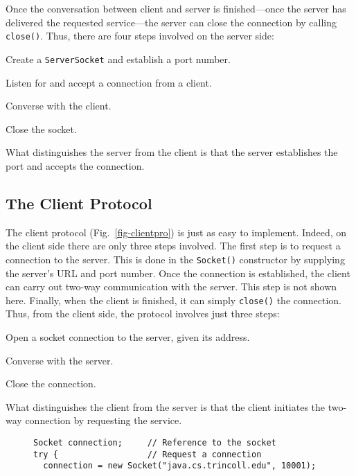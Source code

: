 {Once the conversation between client and server is finished---once
the server has delivered the requested service---the server can close
the connection by calling {\tt close()}. Thus, there are four steps
involved on the server side:

\begin{BL}
\item  Create a {\tt ServerSocket} and establish a port number.
\item  Listen for and accept a connection from a client.
\item  Converse with the client.
\item  Close the socket.
\end{BL}

\noindent What distinguishes the server from the client is that
the server establishes the port and accepts the connection.



\subsection{The Client Protocol}
\noindent The client protocol (Fig.~\ref{fig-clientpro}) is just as easy to
implement.   Indeed, on the client side there are only three steps involved.
The first step is to request a connection to the server.  This is done
in the {\tt Socket()} constructor by supplying the server's URL and
port number.  Once the connection is established, the client can carry
out two-way communication with the server.  This step is not shown
here.  Finally, when the client is finished, it can simply {\tt close()}
the connection.  Thus, from the client side, the protocol involves just
three steps:

\begin{BL}
\item  Open a socket connection to the server, given its address.
\item  Converse with the server.
\item  Close the connection.
\end{BL}

\noindent What distinguishes the client from the server is that the
client initiates the two-way connection by requesting the service.

\begin{figure}[thb]
\jjjprogstart
\begin{jjjlisting}
\begin{lstlisting}
Socket connection;     // Reference to the socket
try {                  // Request a connection
  connection = new Socket("java.cs.trincoll.edu", 10001);


\end{lstlisting}
\end{jjjlisting}
\end{figure}}
